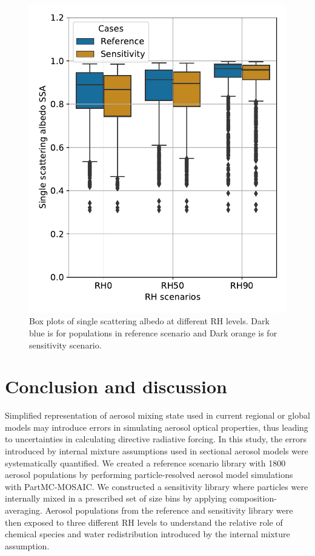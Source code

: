 \documentclass[edeposit,fullpage]{uiucthesis2009}
\begin{document}
\begin{figure}[H]
	\centering
	\includegraphics[scale=0.50]{chap4_figs/fig_sup4.pdf}
	\caption{Box plots of single scattering albedo at different RH levels. Dark blue is for populations
	in reference scenario and Dark orange is for sensitivity scenario.}
	\label{fig_sup4}
\end{figure}

\section{Conclusion and discussion}
\label{sec:conclusion}

Simplified representation of aerosol mixing state used in current
regional or global models may introduce errors in simulating aerosol
optical properties, thus leading to uncertainties in calculating
directive radiative forcing. In this study, the errors introduced by
internal mixture assumptions used in sectional aerosol models were
systematically quantified. We created a reference scenario library
with 1800 aerosol populations by performing particle-resolved aerosol model
simulations with PartMC-MOSAIC. We constructed a sensitivity library
where particles were internally mixed in a prescribed set of size bins
by applying composition-averaging. Aerosol populations from the
reference and sensitivity library were then exposed to three different
RH levels to understand the relative role of chemical species and
water redistribution introduced by the internal mixture assumption.
\end{document}
